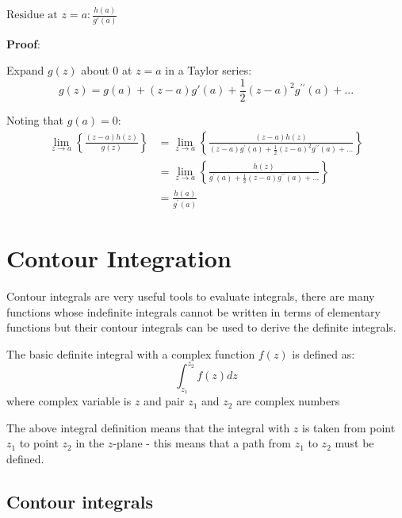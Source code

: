 \documentclass[10pt,a4paper]{article}
\begin{document}
\begin{tcolorbox}[breakable,colback=white]
$\text{Residue at }z=a: \frac{h(a)}{g'(a)}$
\end{tcolorbox}

\textbf{Proof}: \par 
Expand $g(z)$ about 0 at $z=a$ in a Taylor series:
$$
g(z)=g(a) + (z-a)g'(a) + \frac{1}{2}(z-a)^2g^{\prime \prime}(a)+ ...
$$

Noting that $g(a)=0$: 
\begin{equation*} 
    \begin{aligned}
        \lim_{z \rightarrow a} \left\{\frac{(z-a)h(z)}{g(z)}\right\} &= \lim_{z \rightarrow a} \left\{\frac{(z-a)h(z)}{(z-a)g^{\prime}(a)+\frac{1}{2}(z-a)^2 g^{\prime \prime}(a)+...}\right\} \\
        &= \lim_{z \rightarrow a} \left\{\frac{h(z)}{g^{\prime}(a) + \frac{1}{2}(z-a)g^{\prime \prime}(a) + ...}\right\} \\
        &= \frac{h(a)}{g^\prime (a)}
    \end{aligned}
\end{equation*}

\pagebreak

\section{Contour Integration}

Contour integrals are very useful tools to evaluate integrals, there are many functions whose
indefinite integrals cannot be written in terms of elementary functions but their contour integrals
can be used to derive the definite integrals.

The basic definite integral with a complex function $f(z)$ is defined as:
$$
\int_{z_1}^{z_2} f(z)dz
$$
where complex variable is $z$ and pair $z_1$ and $z_2$ are complex numbers \par 

The above integral definition means that the integral with $z$ is taken from point
$z_1$ to point $z_2$ in the $z$-plane - this means that a path from $z_1$ to $z_2$ must be defined.

\subsection{Contour integrals}
\end{document}

